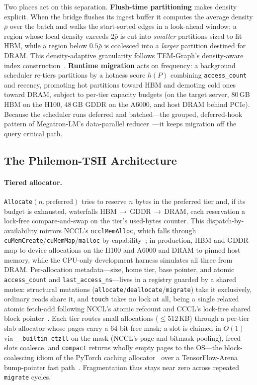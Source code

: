 \documentclass[10pt]{article}
\theoremstyle{definition}
\begin{document}
Two places act on this separation. \textbf{Flush-time partitioning} makes density
explicit. When the bridge flushes its ingest buffer it computes the average
density $\bar\rho$ over the batch and walks the start-sorted edges in a
look-ahead window; a region whose local density exceeds $2\bar\rho$ is cut into
\emph{smaller} partitions sized to fit HBM, while a region below $0.5\bar\rho$ is
coalesced into a \emph{larger} partition destined for DRAM. This density-adaptive
granularity follows TEM-Graph's density-aware index construction~\citep{temgraph}.
\textbf{Runtime migration} acts on frequency: a background scheduler re-tiers
partitions by a hotness score $h(P)$ combining \texttt{access\_count} and
recency, promoting hot partitions toward HBM and demoting cold ones toward DRAM,
subject to per-tier capacity budgets (on the target server, $80$\,GB HBM on the
H100, $48$\,GB GDDR on the A6000, and host DRAM behind PCIe). Because the
scheduler runs deferred and batched---the grouped, deferred-hook pattern of
Megatron-LM's data-parallel reducer~\citep{shoeybi2019megatron}---it keeps
migration off the query critical path.

\subsection{The Philemon-TSH Architecture}
\label{sec:architecture}

\paragraph{Tiered allocator.}
\texttt{Allocate}$(n,\text{preferred})$ tries to reserve $n$ bytes in the
preferred tier and, if its budget is exhausted, waterfalls
HBM\,$\rightarrow$\,GDDR\,$\rightarrow$\,DRAM, each reservation a lock-free
compare-and-swap on the tier's used-bytes counter. This dispatch-by-availability
mirrors NCCL's \texttt{ncclMemAlloc}, which falls through
\texttt{cuMemCreate}/\texttt{cuMemMap}/\texttt{malloc} by
capability~\citep{nccl}; in production, HBM and GDDR map to device allocations on
the H100 and A6000 and DRAM to pinned host memory, while the CPU-only development
harness simulates all three from DRAM. Per-allocation metadata---size, home tier,
base pointer, and atomic \texttt{access\_count} and \texttt{last\_access\_ns}---lives
in a registry guarded by a shared mutex: structural mutations
(\texttt{allocate}/\texttt{deallocate}/\texttt{migrate}) take it exclusively,
ordinary reads share it, and \texttt{touch} takes no lock at all, being a single
relaxed atomic fetch-add following NCCL's atomic refcount and CCCL's lock-free
shared block pointer~\citep{cccl}. Each tier routes small allocations
($\le 512$\,KB) through a per-tier slab allocator whose pages carry a $64$-bit
free mask; a slot is claimed in $O(1)$ via \texttt{\_\_builtin\_ctzll} on the mask
(NCCL's page-and-bitmask pooling), freed slots coalesce, and \texttt{compact}
returns wholly empty pages to the OS---the block-coalescing idiom of the PyTorch
caching allocator~\citep{paszke2019pytorch} over a TensorFlow-Arena
bump-pointer fast path~\citep{abadi2016tensorflow}. Fragmentation thus stays near
zero across repeated \texttt{migrate} cycles.
\end{document}
